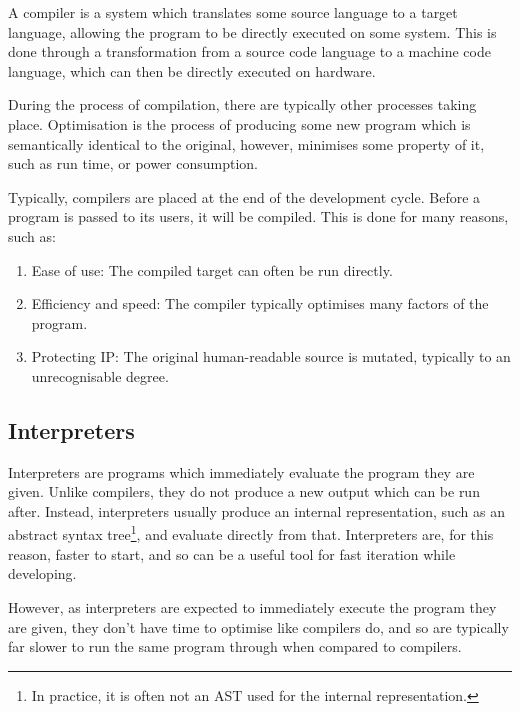A compiler is a system which translates some source language to a target language, allowing the program to be directly executed on some system. This is done through a transformation from a source code language to a machine code language, which can then be directly executed on hardware. 

During the process of compilation, there are typically other processes taking place. Optimisation is the process of producing some new program which is semantically identical to the original, however, minimises some property of it, such as run time, or power consumption.

Typically, compilers are placed at the end of the development cycle. Before a program is passed to its users, it will be compiled. This is done for many reasons, such as:
\begin{enumerate}
    \item Ease of use: The compiled target can often be run directly\cite{PortabilityofC}.
    \item Efficiency and speed: The compiler typically optimises many factors of the program\cite{UnifiedOptimisations, HPCOPtimisations, CompCert}.
    \item Protecting IP: The original human-readable source is mutated, typically to an unrecognisable degree\cite{CompilerObfuscationSurvey, ASMObfuscation}.
\end{enumerate}

\subsection{Interpreters}

Interpreters are programs which immediately evaluate the program they are given. Unlike compilers, they do not produce a new output which can be run after. Instead, interpreters usually produce an internal representation, such as an abstract syntax tree\footnote{In practice, it is often not an AST used for the internal representation.}, and evaluate directly from that\cite{InterpreterStructure}.
Interpreters are, for this reason, faster to start, and so can be a useful tool for fast iteration while developing\cite{OptimisingInterpreters, InterpreterStructure}. 

However, as interpreters are expected to immediately execute the program they are given, they don't have time to optimise like compilers do, and so are typically far slower to run the same program through when compared to compilers\cite{CompilersAndInterpretersJava, InterpreterStructure}.


